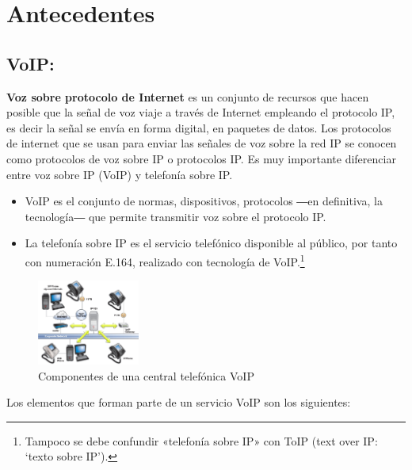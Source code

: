 \documentclass[conference]{IEEEtran}
\begin{document}
\section{Antecedentes}\label{sec:ant}
\subsection{\textbf{ VoIP:}} 
\textbf{Voz sobre protocolo de Internet} es un conjunto de recursos que hacen posible que la señal de voz viaje a través de Internet empleando el protocolo IP, es decir la señal se envía en forma digital, en paquetes de datos. Los protocolos de internet que se usan para enviar las señales de voz sobre la red IP se conocen como protocolos de voz sobre IP o protocolos IP. 
Es muy importante diferenciar entre voz sobre IP (VoIP) y telefonía sobre IP.
\begin{itemize}
\item VoIP es el conjunto de normas, dispositivos, protocolos ―en definitiva, la tecnología― que permite transmitir voz sobre el protocolo IP.
\item La telefonía sobre IP es el servicio telefónico disponible al público, por tanto con numeración E.164, realizado con tecnología de VoIP.\footnote{Tampoco se debe confundir «telefonía sobre IP» con ToIP (text over IP: ‘texto sobre IP’).}
\end{itemize}
\begin{figure}[h]
	\centerline{\includegraphics[width=0.3\textwidth]{img/voip01.jpg}}
	\caption{Componentes de una central telefónica VoIP}
	\label{fig:ant00}
\end{figure}
Los elementos que forman parte de un servicio VoIP son los siguientes:
\end{document}
